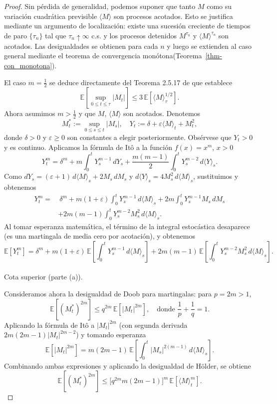 \documentclass[
  spanish,
  us-letterpaper,
]{scrreprt}
\makeatletter
\let\oldparagraph\paragraph
\renewcommand{\paragraph}{
    \@ifstar
      \xxxParagraphStar
      \xxxParagraphNoStar
  }
\newcommand{\xxxParagraphStar}[1]{\oldparagraph*{#1}\mbox{}}
\newcommand{\xxxParagraphNoStar}[1]{\oldparagraph{#1}\mbox{}}
\theoremstyle{plain}
\theoremstyle{plain}
\theoremstyle{definition}
\theoremstyle{remark}
\makeatother
\begin{document}
\begin{proof}
Sin pérdida de generalidad, podemos suponer que tanto \(M\) como su
variación cuadrática previsible \(\langle M \rangle\) son procesos
acotados. Esto se justifica mediante un argumento de localización:
existe una sucesión creciente de tiempos de paro \(\{\tau_n\}\) tal que
\(\tau_n \uparrow \infty\) c.s. y los procesos detenidos \(M^{\tau_n}\)
y \(\langle M \rangle^{\tau_n}\) son acotados. Las desigualdades se
obtienen para cada \(n\) y luego se extienden al caso general mediante
el teorema de convergencia monótona(Teorema~\ref{thm-con_monotona}).

El caso \(m = \tfrac{1}{2}\) se deduce directamente del Teorema 2.5.17
de \autocite{tudor2022procesos} que establece
\[\mathbb{E}\left[ \sup_{0 \leq t \leq \tau} |M_t| \right] \leq 3 \, \mathbb{E}\left[ \langle M \rangle_\tau^{1/2} \right].\]
Ahora asumimos \(m > \tfrac{1}{2}\) y que \(M\), \(\langle M \rangle\)
son acotados. Denotemos
\[ M_t^* := \sup_{0 \leq s \leq t} |M_s|, \quad Y_t := \delta + \varepsilon \langle M \rangle_t + M_t^2,\]
donde \(\delta > 0\) y \(\varepsilon \geq 0\) son constantes a elegir
posteriormente. Obsérvese que \(Y_t > 0\) y es continuo. Aplicamos la
fórmula de Itô a la función \(f(x) = x^m\), \(x > 0\)
\[Y_t^m = \delta^m + m \int_0^t Y_s^{m-1} \, dY_s + \frac{m(m-1)}{2} \int_0^t Y_s^{m-2} \, d\langle Y \rangle_s.\]
Como
\(dY_s = (\varepsilon + 1) \, d\langle M \rangle_s + 2 M_s \, dM_s\) y
\(d\langle Y \rangle_s = 4 M_s^2 \, d\langle M \rangle_s\), sustituimos
y obtenemos \[\begin{aligned}
Y_t^m = &\ \delta^m 
+ m(1+\varepsilon) \int_0^t Y_s^{m-1} \, d\langle M \rangle_s 
+ 2m \int_0^t Y_s^{m-1} M_s \, dM_s \\
&+ 2m(m-1) \int_0^t Y_s^{m-2} M_s^2 \, d\langle M \rangle_s.
\end{aligned}\] Al tomar esperanza matemática, el término de la integral
estocástica desaparece (es una martingala de media cero por acotación),
y obtenemos
\[\mathbb{E}[Y_t^m] = \delta^m + m(1+\varepsilon) \, \mathbb{E}\!\left[ \int_0^t Y_s^{m-1} \, d\langle M \rangle_s \right] + 2m(m-1) \, \mathbb{E}\!\left[ \int_0^t Y_s^{m-2} M_s^2 \, d\langle M \rangle_s \right].\]

\paragraph{Cota superior (parte (a)).}

Consideramos ahora la desigualdad de Doob para martingalas: para
\(p = 2m > 1\),
\[ \mathbb{E}[(M_t^*)^{2m}] \leq q^{2m} \, \mathbb{E}[|M_t|^{2m}], \quad \text{donde } \frac{1}{p} + \frac{1}{q} = 1.\]
Aplicando la fórmula de Itô a \(|M_t|^{2m}\) (con segunda derivada
\(2m(2m-1)|M_t|^{2m-2}\)) y tomando esperanza
\[\mathbb{E}[|M_t|^{2m}] = m(2m-1) \, \mathbb{E}\!\left[ \int_0^t |M_s|^{2(m-1)} \, d\langle M \rangle_s \right].\]
Combinando ambas expresiones y aplicando la desigualdad de Hölder, se
obtiene
\[ \mathbb{E}[(M_t^*)^{2m}] \leq \bigl[ q^{2m} m (2m - 1) \bigr]^m \, \mathbb{E}[\langle M \rangle_t^m].\]


\end{proof}
\end{document}

